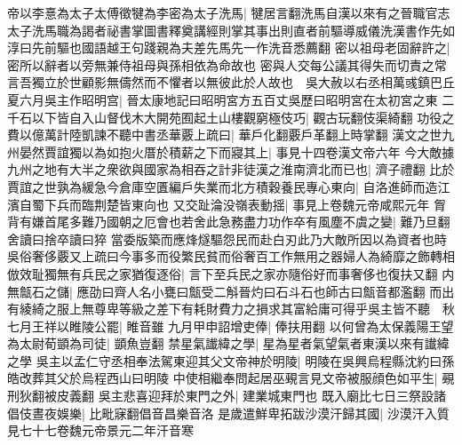 帝以李憙為太子太傅徵犍為李密為太子洗馬|{
	犍居言翻洗馬自漢以來有之晉職官志太子洗馬職為謁者祕書掌圖書釋奠講經則掌其事出則直者前驅導威儀洗漢書作先如淳曰先前驅也國語越王句踐親為夫差先馬先一作洗音悉薦翻}
密以祖母老固辭許之|{
	密所以辭者以旁無兼侍祖母與孫相依為命故也}
密與人交每公議其得失而切責之常言吾獨立於世顧影無儔然而不懼者以無彼此於人故也　吳大赦以右丞相萬彧鎮巴丘　夏六月吳主作昭明宫|{
	晉太康地記曰昭明宮方五百丈吳歷曰昭明宮在太初宮之東}
二千石以下皆自入山督伐木大開苑囿起土山樓觀窮極伎巧|{
	觀古玩翻伎渠綺翻}
功役之費以億萬計陸凱諫不聽中書丞華覈上疏曰|{
	華戶化翻覈戶革翻上時掌翻}
漢文之世九州晏然賈誼獨以為如抱火厝於積薪之下而寢其上|{
	事見十四卷漢文帝六年}
今大敵據九州之地有大半之衆欲與國家為相吞之計非徒漢之淮南濟北而已也|{
	濟子禮翻}
比於賈誼之世孰為緩急今倉庫空匱編戶失業而北方積穀養民專心東向|{
	自洛進師而造江濱自蜀下兵而臨荆楚皆東向也}
又交趾淪没嶺表動揺|{
	事見上卷魏元帝咸熙元年}
胷背有嫌首尾多難乃國朝之厄會也若舍此急務盡力功作卒有風塵不虞之變|{
	難乃旦翻舍讀曰捨卒讀曰猝}
當委版築而應烽燧驅怨民而赴白刃此乃大敵所因以為資者也時吳俗奢侈覈又上疏曰今事多而役繁民貧而俗奢百工作無用之器婦人為綺靡之飾轉相倣效耻獨無有兵民之家猶復逐俗|{
	言下至兵民之家亦隨俗好而事奢侈也復扶又翻}
内無甔石之儲|{
	應劭曰齊人名小甕曰甔受二斛晉灼曰石斗石也師古曰甔音都濫翻}
而出有綾綺之服上無尊卑等級之差下有耗財費力之損求其富給庸可得乎吳主皆不聽　秋七月王祥以睢陵公罷|{
	睢音雖}
九月甲申詔增吏俸|{
	俸扶用翻}
以何曾為太保義陽王望為太尉荀顗為司徒|{
	顗魚豈翻}
禁星氣䜟緯之學|{
	星為星者氣望氣者東漢以來有䜟緯之學}
吳主以孟仁守丞相奉法駕東迎其父文帝神於明陵|{
	明陵在吳興烏程縣沈約曰孫皓改葬其父於烏程西山曰明陵}
中使相繼奉問起居巫覡言見文帝被服顔色如平生|{
	覡刑狄翻被皮義翻}
吳主悲喜迎拜於東門之外|{
	建業城東門也}
既入廟比七日三祭設諸倡伎晝夜娛樂|{
	比毗寐翻倡音昌樂音洛}
是歲遣鮮卑拓跋沙漠汗歸其國|{
	沙漠汗入質見七十七卷魏元帝景元二年汗音寒}



